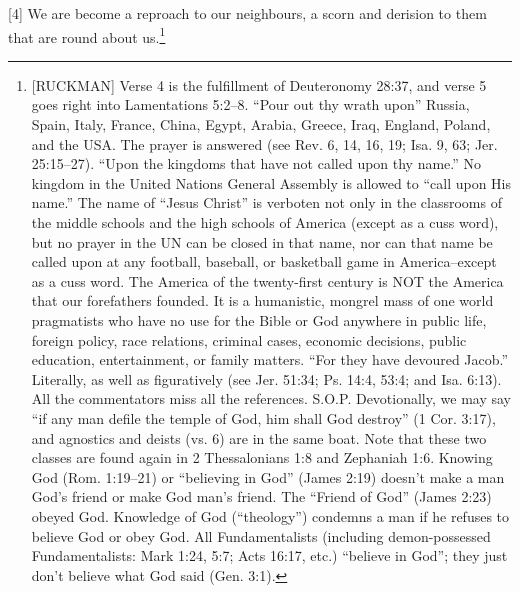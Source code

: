 [4] \textcolor[rgb]{0.00,0.00,1.00}{We are become a reproach to our neighbours, a scorn and derision to them that are round about us.}\footnote{[RUCKMAN] Verse 4 is the fulfillment of Deuteronomy 28:37, and verse 5 goes right into Lamentations 5:2--8. “Pour out thy wrath upon” Russia, Spain, Italy, France, China, Egypt, Arabia, Greece, Iraq, England, Poland, and the USA. The prayer is answered (see Rev. 6, 14, 16, 19; Isa. 9, 63; Jer. 25:15--27). “Upon the kingdoms that have not called upon thy name.” No kingdom in the United Nations General Assembly is allowed to “call upon His name.” The name of “Jesus Christ” is verboten not only in the classrooms of the middle schools and the high schools of America (except as a cuss word), but no prayer in the UN can be closed in that name, nor can that name be called upon at any football, baseball, or basketball game in America--except as a cuss word. The  America of the twenty-first century is NOT the America that our forefathers founded. It is a humanistic, mongrel mass of one world pragmatists who have no use for the Bible or God anywhere in public life, foreign policy, race relations, criminal cases, economic decisions, public education, entertainment, or family matters. “For they have devoured Jacob.” Literally, as well as figuratively (see Jer. 51:34; Ps. 14:4, 53:4; and Isa. 6:13). All the commentators miss all the references. S.O.P. Devotionally, we may say “if any man defile the temple of God, him shall God destroy”  (1 Cor. 3:17), and agnostics and deists (vs. 6) are in the same boat. Note that these two classes are found again in 2 Thessalonians 1:8 and Zephaniah 1:6. Knowing God (Rom. 1:19--21) or “believing in God” (James 2:19)  doesn’t make a man God’s friend or make God man’s friend. The “Friend of God” (James 2:23) obeyed God. Knowledge of God (“theology”) condemns a man if he refuses to believe God or obey God. All Fundamentalists (including demon-possessed Fundamentalists: Mark 1:24, 5:7; Acts 16:17, etc.) “believe in God”; they just don’t believe what God said (Gen. 3:1).\cite{Ruckman1992Psalms}}
